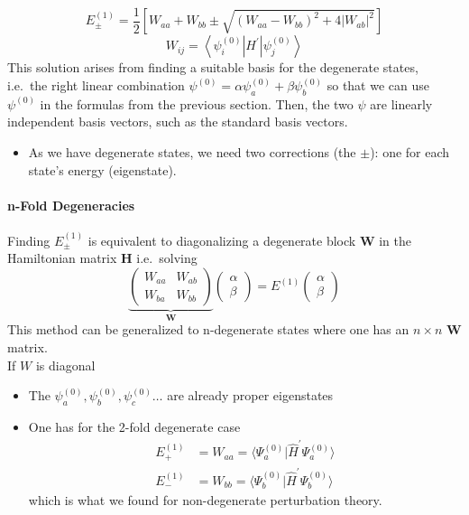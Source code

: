 \newpar{}

\begin{equation*}
    E_{\pm}^{(1)}=\frac{1}{2}\left[W_{aa}+W_{bb}\pm\sqrt{{(W_{aa}-W_{bb})}^{2}+4 |W_{ab}|^{2}}\right]
\end{equation*}
\begin{equation*}
    W_{ij}=\left\langle\psi_{i}^{(0)} \left| H^{\prime} \right|\psi_{j}^{(0)}\right\rangle
\end{equation*}
This solution arises from finding a suitable basis for the degenerate states, i.e.\ the right linear combination $\psi^{(0)}=\alpha\psi_a^{(0)}+\beta\psi_b^{(0)}$ so that we can use $\psi^{(0)}$ in the formulas from the previous section. Then, the two $\psi$ are linearly independent basis vectors, such as the standard basis vectors.

\newpar{}
\begin{itemize}
    \item As we have degenerate states, we need two corrections (the $\pm$): one for each state's energy (eigenstate).
\end{itemize}

\paragraph{n-Fold Degeneracies}
Finding $E_{\pm}^{(1)}$ is equivalent to diagonalizing a degenerate block $\mathbf{W}$ in the Hamiltonian matrix $\mathbf{H}$ i.e.\ solving
\begin{equation*}
    \underbrace{
        \left(\begin{array}{cc}
            W_{aa} & W_{ab} \\
            W_{ba} & W_{bb}
        \end{array}\right)}_{\mathbf{W}}
    \left(\begin{array}{c}
            \alpha \\
            \beta
        \end{array}\right)
    =E^{(1)}\left(\begin{array}{c}
            \alpha \\
            \beta
        \end{array}\right)
\end{equation*}
This method can be generalized to n-degenerate states where one has an $n\times n$ $\mathbf{W}$ matrix.\\
If $W$ is diagonal
\begin{itemize}
    \item The $\psi_a^{(0)},\psi_b^{(0)},\psi_c^{(0)} \dots $ are already proper eigenstates
    \item One has for the 2-fold degenerate case
          \begin{align*}
              E_{+}^{(1)} & =W_{aa}=\langle\Psi_{a}^{(0)}|\hat{H}^{\prime}\Psi_{a}^{(0)}\rangle \\
              E_{-}^{(1)} & =W_{bb}=\langle\Psi_{b}^{(0)}|\hat{H}^{\prime}\Psi_{b}^{(0)}\rangle
          \end{align*}
          which is what we found for non-degenerate perturbation theory.
\end{itemize}

